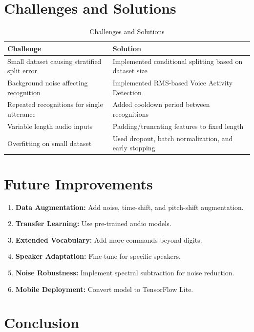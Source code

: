 \documentclass[a4paper,12pt]{article}
\begin{document}
\section{Challenges and Solutions}

\begin{table}[h]
\centering
\begin{tabular}{|p{5cm}|p{7cm}|}
\hline
\textbf{Challenge} & \textbf{Solution} \\
\hline
Small dataset causing stratified split error & Implemented conditional splitting based on dataset size \\
\hline
Background noise affecting recognition & Implemented RMS-based Voice Activity Detection \\
\hline
Repeated recognitions for single utterance & Added cooldown period between recognitions \\
\hline
Variable length audio inputs & Padding/truncating features to fixed length \\
\hline
Overfitting on small dataset & Used dropout, batch normalization, and early stopping \\
\hline
\end{tabular}
\caption{Challenges and Solutions}
\end{table}

\section{Future Improvements}

\begin{enumerate}
    \item \textbf{Data Augmentation:} Add noise, time-shift, and pitch-shift augmentation.
    \item \textbf{Transfer Learning:} Use pre-trained audio models.
    \item \textbf{Extended Vocabulary:} Add more commands beyond digits.
    \item \textbf{Speaker Adaptation:} Fine-tune for specific speakers.
    \item \textbf{Noise Robustness:} Implement spectral subtraction for noise reduction.
    \item \textbf{Mobile Deployment:} Convert model to TensorFlow Lite.
\end{enumerate}

\section{Conclusion}
\end{document}
